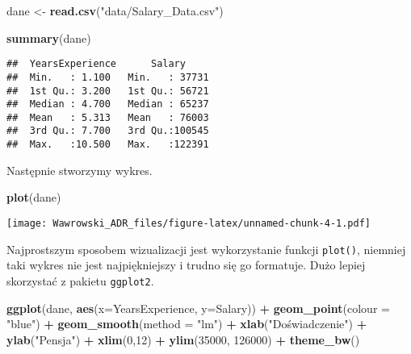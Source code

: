 \documentclass[]{book}
\newenvironment{Shaded}{\begin{snugshade}}{\end{snugshade}}
\newcommand{\KeywordTok}[1]{\textcolor[rgb]{0.13,0.29,0.53}{\textbf{#1}}}
\newcommand{\DataTypeTok}[1]{\textcolor[rgb]{0.13,0.29,0.53}{#1}}
\newcommand{\DecValTok}[1]{\textcolor[rgb]{0.00,0.00,0.81}{#1}}
\newcommand{\StringTok}[1]{\textcolor[rgb]{0.31,0.60,0.02}{#1}}
\newcommand{\OperatorTok}[1]{\textcolor[rgb]{0.81,0.36,0.00}{\textbf{#1}}}
\newcommand{\NormalTok}[1]{#1}
\begin{document}
\begin{Shaded}
\begin{Highlighting}[]
\NormalTok{dane <-}\StringTok{ }\KeywordTok{read.csv}\NormalTok{(}\StringTok{"data/Salary_Data.csv"}\NormalTok{)}

\KeywordTok{summary}\NormalTok{(dane)}
\end{Highlighting}
\end{Shaded}

\begin{verbatim}
##  YearsExperience      Salary      
##  Min.   : 1.100   Min.   : 37731  
##  1st Qu.: 3.200   1st Qu.: 56721  
##  Median : 4.700   Median : 65237  
##  Mean   : 5.313   Mean   : 76003  
##  3rd Qu.: 7.700   3rd Qu.:100545  
##  Max.   :10.500   Max.   :122391
\end{verbatim}

Następnie stworzymy wykres.

\begin{Shaded}
\begin{Highlighting}[]
\KeywordTok{plot}\NormalTok{(dane)}
\end{Highlighting}
\end{Shaded}

\texttt{[image: Wawrowski\_ADR\_files/figure-latex/unnamed-chunk-4-1.pdf]}

Najprostszym sposobem wizualizacji jest wykorzystanie funkcji
\texttt{plot()}, niemniej taki wykres nie jest najpiękniejszy i trudno
się go formatuje. Dużo lepiej skorzystać z pakietu \texttt{ggplot2}.

\begin{Shaded}
\begin{Highlighting}[]
\KeywordTok{ggplot}\NormalTok{(dane, }\KeywordTok{aes}\NormalTok{(}\DataTypeTok{x=}\NormalTok{YearsExperience, }\DataTypeTok{y=}\NormalTok{Salary)) }\OperatorTok{+}\StringTok{ }
\StringTok{  }\KeywordTok{geom_point}\NormalTok{(}\DataTypeTok{colour =} \StringTok{"blue"}\NormalTok{) }\OperatorTok{+}
\StringTok{  }\KeywordTok{geom_smooth}\NormalTok{(}\DataTypeTok{method =} \StringTok{"lm"}\NormalTok{) }\OperatorTok{+}
\StringTok{  }\KeywordTok{xlab}\NormalTok{(}\StringTok{"Doświadczenie"}\NormalTok{) }\OperatorTok{+}\StringTok{ }
\StringTok{  }\KeywordTok{ylab}\NormalTok{(}\StringTok{"Pensja"}\NormalTok{) }\OperatorTok{+}
\StringTok{  }\KeywordTok{xlim}\NormalTok{(}\DecValTok{0}\NormalTok{,}\DecValTok{12}\NormalTok{) }\OperatorTok{+}
\StringTok{  }\KeywordTok{ylim}\NormalTok{(}\DecValTok{35000}\NormalTok{, }\DecValTok{126000}\NormalTok{) }\OperatorTok{+}
\StringTok{  }\KeywordTok{theme_bw}\NormalTok{()}
\end{Highlighting}
\end{Shaded}
\end{document}
